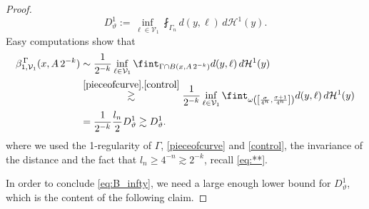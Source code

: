 \documentclass[12pt]{amsart}
\renewcommand{\theta}{\vartheta}
\numberwithin{equation}{section}
\theoremstyle{plain}
\theoremstyle{definition}
\theoremstyle{remark}
\begin{document}
\begin{proof}
 \[D_\theta^1:=\inf_{\ell\in\mathcal V_1} \fint_{\Gamma_n} d(y,\ell)\,d\mathcal H^1(y).\]
 Easy computations show that
 \[\begin{split}\beta^{\,\Gamma}_{1,\mathcal V_1}(x, A\,2^{-k})&\sim\frac{1}{2^{-k}}\inf_{\ell\in \mathcal V_1}\fint_{\Gamma\cap B(x, A\,2^{-k})}d(y,\ell)\,d\mathcal H^1(y)\\ &\overset{\eqref{pieceofcurve},\eqref{control}}{\gtrsim}\frac{1}{2^{-k}}\inf_{\ell\in \mathcal V_1}\fint_{\omega\left(\left[\frac{\sigma}{4^n},\frac{\sigma+1}{4^n}\right]\right)}d(y,\ell)\,d\mathcal H^1(y)\\ &=\frac{1}{2^{-k}}\frac{l_n}{2} D_\theta^1 \gtrsim D_\theta^1.\end{split}\]
 where we used the 1-regularity of $\Gamma$, \eqref{pieceofcurve} and \eqref{control}, the invariance of the distance and the fact that $l_n\geq 4^{-n}\gtrsim2^{-k}$, recall \eqref{eq:**}.


 In order to conclude \eqref{eq:B_infty}, we need a large enough lower bound for $D^1_{\theta}$, which is the content of the following claim.
 \medskip


\end{proof}
\end{document}
